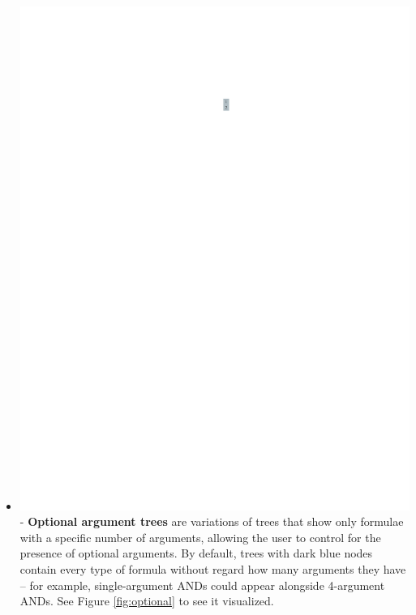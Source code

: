 \documentclass[conference]{IEEEtran}
\begin{document}
\begin{itemize}
		\item  \vspace{.25cm} \includegraphics[scale=.75]{glossary-lightblue} - \textbf{Optional
			argument trees} are variations of trees that show only formulae with a
		specific number of arguments, allowing the user to control for the presence of
		optional arguments. By default, trees with dark blue nodes contain every type
		of formula without regard how many arguments they have -- for example,
		single-argument ANDs could appear alongside 4-argument ANDs. See Figure
		\ref{fig:optional} to see it visualized.
	\end{itemize}
	
\end{document}
